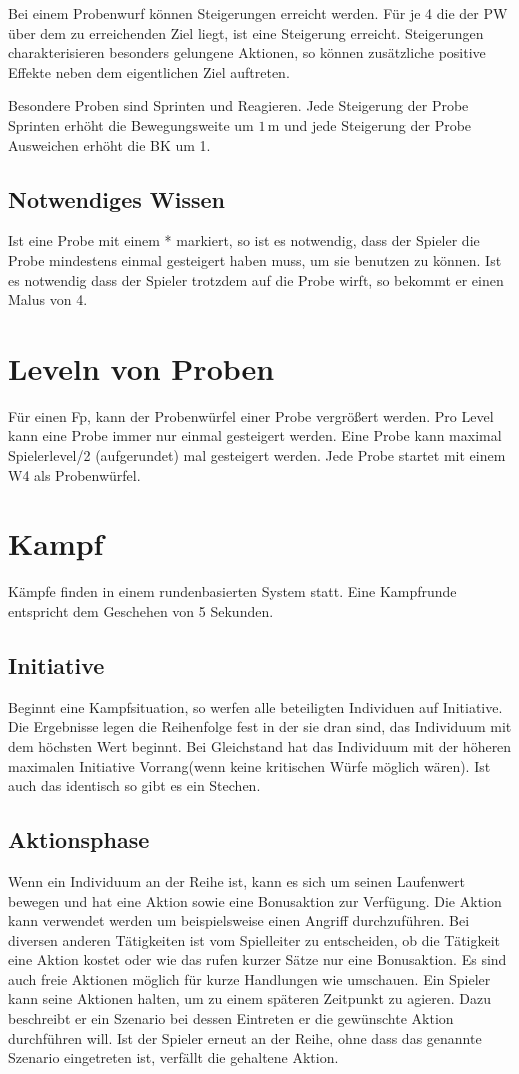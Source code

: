 \documentclass[../../Heldenanleitung2]{subfiles}
\begin{document}
Bei einem Probenwurf können Steigerungen erreicht werden. Für je 4 die der PW über dem zu erreichenden Ziel liegt, ist eine Steigerung erreicht. Steigerungen charakterisieren besonders gelungene Aktionen, so können zusätzliche positive Effekte neben dem eigentlichen Ziel auftreten.

Besondere Proben sind Sprinten und Reagieren. Jede Steigerung der Probe Sprinten erhöht die Bewegungsweite um $1$\,m und jede Steigerung der Probe Ausweichen erhöht die BK um 1.

\subsection{Notwendiges Wissen}
Ist eine Probe mit einem * markiert, so ist es notwendig, dass der Spieler die Probe mindestens einmal gesteigert haben muss, um sie benutzen zu können. Ist es notwendig dass der Spieler trotzdem auf die Probe wirft, so bekommt er einen Malus von 4.

\section{Leveln von Proben}
Für einen Fp, kann der Probenwürfel einer Probe vergrößert werden. Pro Level kann eine Probe immer nur einmal gesteigert werden. Eine Probe kann maximal Spielerlevel/2 (aufgerundet) mal gesteigert werden. Jede Probe startet mit einem W4 als Probenwürfel.

\section{Kampf}
Kämpfe finden in einem rundenbasierten System statt. Eine Kampfrunde entspricht dem Geschehen von 5 Sekunden.

\subsection{Initiative}
Beginnt eine Kampfsituation, so werfen alle beteiligten Individuen auf Initiative. Die Ergebnisse legen die Reihenfolge fest in der sie dran sind, das Individuum mit dem höchsten Wert beginnt. Bei Gleichstand hat das Individuum mit der höheren maximalen Initiative Vorrang(wenn keine kritischen Würfe möglich wären). Ist auch das identisch so gibt es ein Stechen.

\subsection{Aktionsphase}
Wenn ein Individuum an der Reihe ist, kann es sich um seinen Laufenwert bewegen und hat eine Aktion sowie eine Bonusaktion zur Verfügung. Die Aktion kann verwendet werden um beispielsweise einen Angriff durchzuführen. Bei diversen anderen Tätigkeiten ist vom Spielleiter zu entscheiden, ob die Tätigkeit eine Aktion kostet oder wie das rufen kurzer Sätze nur eine Bonusaktion. Es sind auch freie Aktionen möglich für kurze Handlungen wie umschauen. Ein Spieler kann seine Aktionen halten, um zu einem späteren Zeitpunkt zu agieren. Dazu beschreibt er ein Szenario bei dessen Eintreten er die gewünschte Aktion durchführen will. Ist der Spieler erneut an der Reihe, ohne dass das genannte Szenario eingetreten ist, verfällt die gehaltene Aktion.
\end{document}
